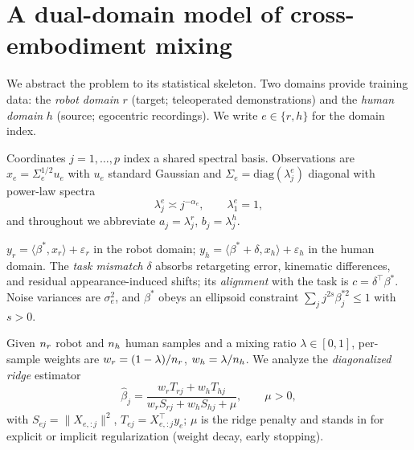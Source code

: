 \section{A dual-domain model of cross-embodiment mixing}
\label{sec:setup}

We abstract the problem to its statistical skeleton.
Two domains provide training data: the \emph{robot domain} $r$ (target; teleoperated demonstrations) and the \emph{human domain} $h$ (source; egocentric recordings).
We write $e \in \{r,h\}$ for the domain index.

\begin{assumption}\label{ass:a1}
Coordinates $j = 1,\dots,p$ index a shared spectral basis.
Observations are $x_e = \Sigma_e^{1/2} u_e$ with $u_e$ standard Gaussian and $\Sigma_e = \mathrm{diag}(\lambda^e_j)$ diagonal with power-law spectra
\begin{equation}
  \lambda^e_j \asymp j^{-\alpha_e}, \qquad \lambda^e_1 = 1,
  \label{eq:powerlaw}
\end{equation}
and throughout we abbreviate $a_j = \lambda^r_j$, $b_j = \lambda^h_j$.
\end{assumption}

\begin{assumption}\label{ass:a2}
$y_r = \langle \beta^*, x_r \rangle + \varepsilon_r$ in the robot domain; $y_h = \langle \beta^* + \delta, x_h \rangle + \varepsilon_h$ in the human domain.
The \emph{task mismatch} $\delta$ absorbs retargeting error, kinematic differences, and residual appearance-induced shifts; its \emph{alignment} with the task is $c = \delta^\top\beta^*$.
Noise variances are $\sigma_e^2$, and $\beta^*$ obeys an ellipsoid constraint $\sum_j j^{2s}\beta_j^{*2} \le 1$ with $s > 0$.
\end{assumption}

\begin{assumption}\label{ass:a3}
Given $n_r$ robot and $n_h$ human samples and a mixing ratio $\lambda \in [0,1]$, per-sample weights are $w_r = (1-\lambda)/n_r$, $w_h = \lambda/n_h$.
We analyze the \emph{diagonalized ridge} estimator
\begin{equation}
  \hat\beta_j = \frac{w_r T_{rj} + w_h T_{hj}}{w_r S_{rj} + w_h S_{hj} + \mu},
  \qquad \mu > 0,
  \label{eq:estimator}
\end{equation}
with $S_{ej} = \|X_{e,:j}\|^2$, $T_{ej} = X_{e,:j}^\top y_e$; $\mu$ is the ridge penalty and stands in for explicit or implicit regularization (weight decay, early stopping).
\end{assumption}

